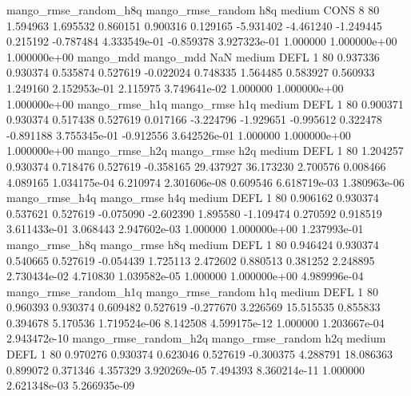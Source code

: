 mango_rmse_random_h8q mango_rmse_random                  h8q     medium     CONS                 8 80  1.594963       1.695532 0.860151       0.900316    0.129165     -5.931402     -4.461240    -1.249445       0.215192 -0.787484 4.333549e-01    -0.859378   3.927323e-01            1.000000    1.000000e+00        1.000000e+00
            mango_mdd         mango_mdd                  NaN     medium     DEFL                 1 80  0.937336       0.930374 0.535874       0.527619   -0.022024      0.748335      1.564485     0.583927       0.560933  1.249160 2.152953e-01     2.115975   3.749641e-02            1.000000    1.000000e+00        1.000000e+00
       mango_rmse_h1q        mango_rmse                  h1q     medium     DEFL                 1 80  0.900371       0.930374 0.517438       0.527619    0.017166     -3.224796     -1.929651    -0.995612       0.322478 -0.891188 3.755345e-01    -0.912556   3.642526e-01            1.000000    1.000000e+00        1.000000e+00
       mango_rmse_h2q        mango_rmse                  h2q     medium     DEFL                 1 80  1.204257       0.930374 0.718476       0.527619   -0.358165     29.437927     36.173230     2.700576       0.008466  4.089165 1.034175e-04     6.210974   2.301606e-08            0.609546    6.618719e-03        1.380963e-06
       mango_rmse_h4q        mango_rmse                  h4q     medium     DEFL                 1 80  0.906162       0.930374 0.537621       0.527619   -0.075090     -2.602390      1.895580    -1.109474       0.270592  0.918519 3.611433e-01     3.068443   2.947602e-03            1.000000    1.000000e+00        1.237993e-01
       mango_rmse_h8q        mango_rmse                  h8q     medium     DEFL                 1 80  0.946424       0.930374 0.540665       0.527619   -0.054439      1.725113      2.472602     0.880513       0.381252  2.248895 2.730434e-02     4.710830   1.039582e-05            1.000000    1.000000e+00        4.989996e-04
mango_rmse_random_h1q mango_rmse_random                  h1q     medium     DEFL                 1 80  0.960393       0.930374 0.609482       0.527619   -0.277670      3.226569     15.515535     0.855833       0.394678  5.170536 1.719524e-06     8.142508   4.599175e-12            1.000000    1.203667e-04        2.943472e-10
mango_rmse_random_h2q mango_rmse_random                  h2q     medium     DEFL                 1 80  0.970276       0.930374 0.623046       0.527619   -0.300375      4.288791     18.086363     0.899072       0.371346  4.357329 3.920269e-05     7.494393   8.360214e-11            1.000000    2.621348e-03        5.266935e-09
